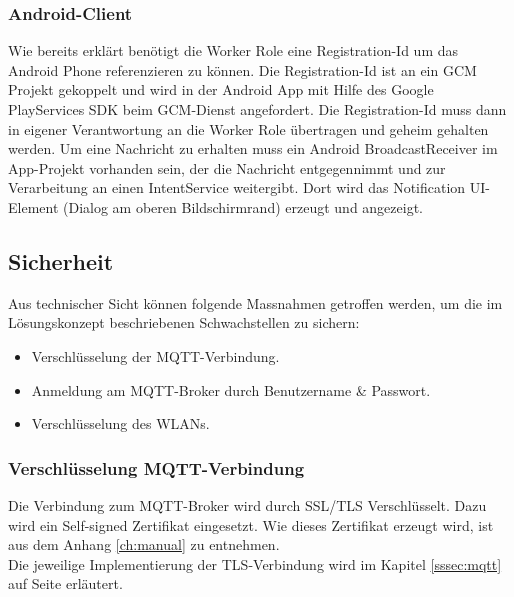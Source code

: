 \subsubsection{Android-Client}
Wie bereits erklärt benötigt die Worker Role eine Registration-Id um das Android Phone referenzieren zu können. Die Registration-Id ist an ein GCM Projekt gekoppelt und wird in der Android App mit Hilfe des Google PlayServices SDK beim GCM-Dienst angefordert. Die Registration-Id muss dann in eigener Verantwortung an die Worker Role übertragen und geheim gehalten werden. Um eine Nachricht zu erhalten muss ein Android BroadcastReceiver im App-Projekt vorhanden sein, der die Nachricht entgegennimmt und zur Verarbeitung an einen IntentService weitergibt. Dort wird das Notification UI-Element (Dialog am oberen Bildschirmrand) erzeugt und angezeigt.

\subsection{Sicherheit}
Aus technischer Sicht können folgende Massnahmen getroffen werden, um die im Lösungskonzept beschriebenen Schwachstellen zu sichern:
\begin{itemize}
	\item Verschlüsselung der MQTT-Verbindung.
	\item Anmeldung am MQTT-Broker durch Benutzername \& Passwort.
	\item Verschlüsselung des WLANs.
\end{itemize}

\subsubsection{Verschlüsselung MQTT-Verbindung}
Die Verbindung zum MQTT-Broker wird durch SSL/TLS Verschlüsselt. Dazu wird ein Self-signed Zertifikat eingesetzt. Wie dieses Zertifikat erzeugt wird, ist aus dem Anhang \ref{ch:manual} zu entnehmen. \\
Die jeweilige Implementierung der TLS-Verbindung wird im Kapitel \ref{sssec:mqtt} auf Seite \pageref{sssec:mqtt} erläutert.

